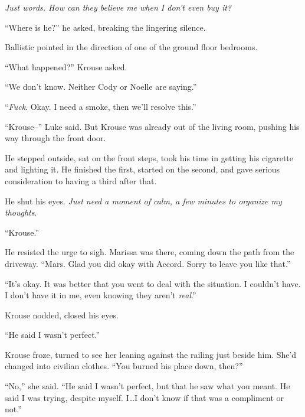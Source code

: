 \emph{Just words.  How can they believe me when I don't even buy it?}



``Where is he?'' he asked, breaking the lingering silence.



Ballistic pointed in the direction of one of the ground floor bedrooms.



``What happened?'' Krouse asked.



``We don't know.  Neither Cody or Noelle are saying.''



``\emph{Fuck}.  Okay.  I need a smoke, then we'll resolve this.''



``Krouse--'' Luke said.  But Krouse was already out of the living room, pushing his way through the front door.



He stepped outside, sat on the front steps, took his time in getting his cigarette and lighting it.  He finished the first, started on the second, and gave serious consideration to having a third after that.



He shut his eyes.  \emph{Just need a moment of calm, a few minutes to organize my thoughts}.



``Krouse.''



He resisted the urge to sigh.  Marissa was there, coming down the path from the driveway.  ``Mars.  Glad you did okay with Accord.  Sorry to leave you like that.''



``It's okay.  It was better that you went to deal with the situation.  I couldn't have.  I don't have it in me, even knowing they aren't \emph{real}.''



Krouse nodded, closed his eyes.



``He said I wasn't perfect.''



Krouse froze, turned to see her leaning against the railing just beside him.  She'd changed into civilian clothes.  ``You burned his place down, then?''



``No,'' she said.  ``He said I wasn't perfect, but that he saw what you meant.  He said I was trying, despite myself.  I\ldots I don't know if that was a compliment or not.''



